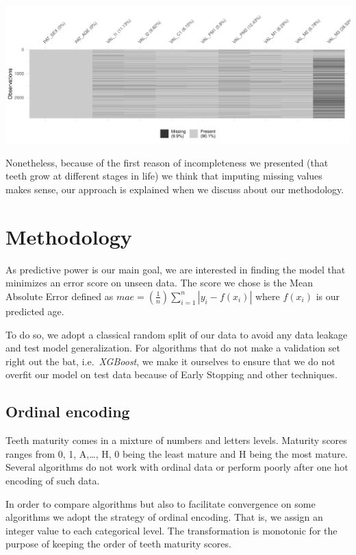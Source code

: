 \documentclass[11pt,]{article}
\begin{document}
\includegraphics{paper_teeth_files/figure-latex/unnamed-chunk-3-1.pdf}

Nonetheless, because of the first reason of incompleteness we presented
(that teeth grow at different stages in life) we think that imputing
missing values makes sense, our approach is explained when we discuss
about our methodology.

\hypertarget{methodology}{%
\section{Methodology}\label{methodology}}

As predictive power is our main goal, we are interested in finding the
model that minimizes an error score on unseen data. The score we chose
is the Mean Absolute Error defined as
\(mae=(\frac{1}{n})\sum_{i=1}^{n}\left | y_{i} - f(x_{i}) \right |\)
where \(f(x_{i})\) is our predicted age.

To do so, we adopt a classical random split of our data to avoid any
data leakage and test model generalization. For algorithms that do not
make a validation set right out the bat, i.e.~\emph{XGBoost}, we make it
ourselves to ensure that we do not overfit our model on test data
because of Early Stopping and other techniques.

\hypertarget{ordinal-encoding}{%
\subsection{Ordinal encoding}\label{ordinal-encoding}}

Teeth maturity comes in a mixture of numbers and letters levels.
Maturity scores ranges from 0, 1, A,\ldots, H, 0 being the least mature
and H being the most mature. Several algorithms do not work with ordinal
data or perform poorly after one hot encoding of such data.

In order to compare algorithms but also to facilitate convergence on
some algorithms we adopt the strategy of ordinal encoding. That is, we
assign an integer value to each categorical level. The transformation is
monotonic for the purpose of keeping the order of teeth maturity scores.
\end{document}
